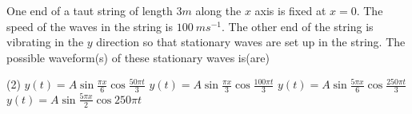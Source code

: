 
\item One end of a taut string of length \(3m\) along the \(x\) axis is fixed at \(x=0\). The speed of the waves in the string is \(100 \ ms^{-1}\). The other end of the string is vibrating in the \(y\) direction so that stationary waves are set up in the string. The possible waveform(s) of these stationary waves is(are)
    \begin{tasks}(2)
        \task \(y(t) = A \sin \frac{\pi x}{6} \cos \frac{50\pi t}{3}\)
        \task \(y(t) = A \sin \frac{\pi x}{3} \cos \frac{100\pi t}{3}\)
        \task \(y(t) = A \sin \frac{5\pi x}{6} \cos \frac{250\pi t}{3}\)
        \task \(y(t) = A \sin \frac{5\pi x}{2} \cos 250\pi t\)
    \end{tasks}
